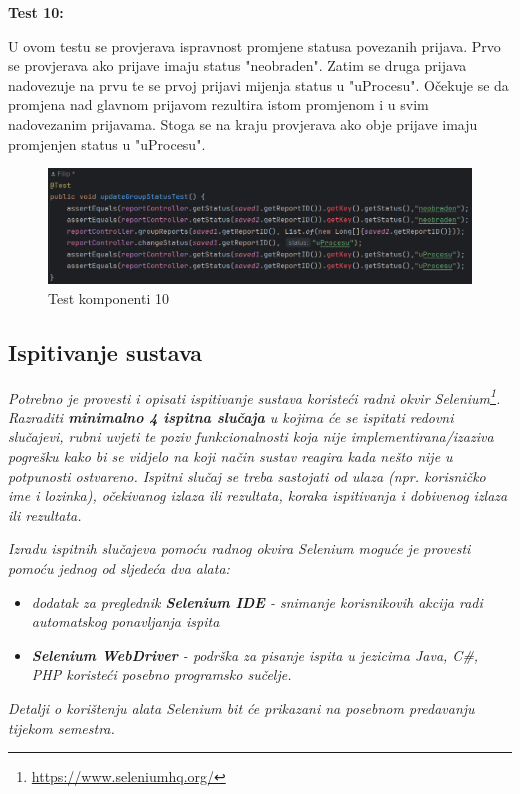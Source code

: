 			\textbf{Test 10:}
			
			U ovom testu se provjerava ispravnost promjene statusa povezanih prijava. Prvo se provjerava ako prijave imaju status "neobraden". Zatim se druga prijava nadovezuje na prvu te se prvoj prijavi mijenja status u "uProcesu". Očekuje se da promjena nad glavnom prijavom rezultira istom promjenom i u svim nadovezanim prijavama. Stoga se na kraju provjerava ako obje prijave imaju promjenjen status u "uProcesu".
			
			\begin{figure}[H]
				\includegraphics[width=\textwidth]{slike/JUnitTest10.png} %
				\caption{Test komponenti 10}
				\label{fig:JUnitTest10} %
			\end{figure}
			
			\subsection{Ispitivanje sustava}
			
			 \textit{Potrebno je provesti i opisati ispitivanje sustava koristeći radni okvir Selenium\footnote{\url{https://www.seleniumhq.org/}}. Razraditi \textbf{minimalno 4 ispitna slučaja} u kojima će se ispitati redovni slučajevi, rubni uvjeti te poziv funkcionalnosti koja nije implementirana/izaziva pogrešku kako bi se vidjelo na koji način sustav reagira kada nešto nije u potpunosti ostvareno. Ispitni slučaj se treba sastojati od ulaza (npr. korisničko ime i lozinka), očekivanog izlaza ili rezultata, koraka ispitivanja i dobivenog izlaza ili rezultata.\\ }
			 
			 \textit{Izradu ispitnih slučajeva pomoću radnog okvira Selenium moguće je provesti pomoću jednog od sljedeća dva alata:}
			 \begin{itemize}
			 	\item \textit{dodatak za preglednik \textbf{Selenium IDE} - snimanje korisnikovih akcija radi automatskog ponavljanja ispita	}
			 	\item \textit{\textbf{Selenium WebDriver} - podrška za pisanje ispita u jezicima Java, C\#, PHP koristeći posebno programsko sučelje.}
			 \end{itemize}
		 	\textit{Detalji o korištenju alata Selenium bit će prikazani na posebnom predavanju tijekom semestra.}
			
